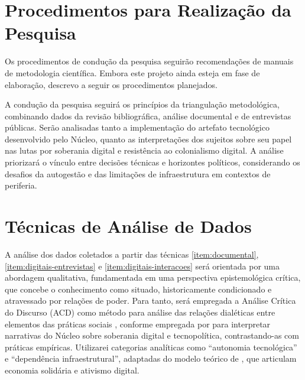 \section{Procedimentos para Realização da Pesquisa}

Os procedimentos de condução da pesquisa seguirão recomendações de manuais de metodologia científica. Embora este projeto ainda esteja em fase de elaboração, descrevo a seguir os procedimentos planejados.

A condução da pesquisa seguirá os princípios da triangulação metodológica, combinando dados da revisão bibliográfica, análise documental e de entrevistas públicas. Serão analisadas tanto a implementação do artefato tecnológico desenvolvido pelo Núcleo, quanto as interpretações dos sujeitos sobre seu papel nas lutas por soberania digital e resistência ao colonialismo digital. A análise priorizará o vínculo entre decisões técnicas e horizontes políticos, considerando os desafios da autogestão e das limitações de infraestrutura em contextos de periferia.

\section{Técnicas de Análise de Dados}

A análise dos dados coletados a partir das técnicas \ref{item:documental}, \ref{item:digitais-entrevistas} e \ref{item:digitais-interacoes} será orientada por uma abordagem qualitativa, fundamentada em uma perspectiva epistemológica crítica, que concebe o conhecimento como situado, historicamente condicionado e atravessado por relações de poder. Para tanto, será empregada a Análise Crítica do Discurso (ACD) como método para análise das relações dialéticas entre elementos das práticas sociais \cite{Fairclough2012}, conforme empregada por  para interpretar narrativas do Núcleo sobre soberania digital e tecnopolítica, contrastando-as com práticas empíricas. Utilizarei categorias analíticas como “autonomia tecnológica” e “dependência infraestrutural”, adaptadas do modelo teórico de , que articulam economia solidária e ativismo digital.


